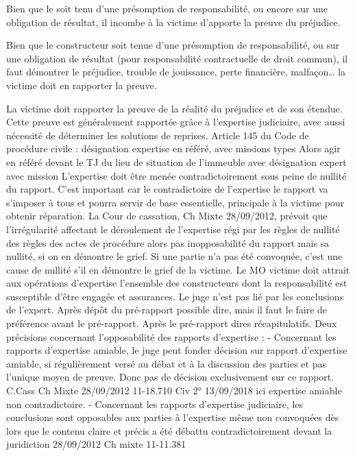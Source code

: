 			Bien que le \lo soit tenu d'une présomption de responsabilité, ou encore sur une obligation de résultat, il incombe à la victime d'apporte la preuve du préjudice.

			Bien que le constructeur soit tenue d’une présomption de responsabilité, ou sur une obligation de résultat (pour responsabilité contractuelle de droit commun), il faut démontrer le préjudice, trouble de jouissance, perte financière, malfaçon… la victime doit en rapporter la preuve.

			La victime doit rapporter la preuve de la réalité du préjudice et de son étendue. Cette preuve est généralement rapportée grâce à l’expertise judiciaire, avec aussi nécessité de déterminer les solutions de reprises.
			Article 145 du Code de procédure civile : désignation expertise en référé, avec missions types
			Alors agir en référé devant le TJ du lieu de situation de l’immeuble avec désignation expert avec mission
			L’expertise doit être menée contradictoirement sous peine de nullité du rapport. C’est important car le contradictoire de l’expertise le rapport va s’imposer à tous et pourra servir de base essentielle, principale à la victime pour obtenir réparation. La Cour de cassation, Ch Mixte 28/09/2012, prévoit que l’irrégularité affectant le déroulement de l’expertise régi par les règles de nullité des règles des actes de procédure alors pas inopposabilité du rapport mais sa nullité, si on en démontre le grief. Si une partie n’a pas été convoquée, c’est une cause de nullité s’il en démontre le grief de la victime.
			Le MO victime doit attrait aux opérations d’expertise l’ensemble des constructeurs dont la responsabilité est susceptible d’être engagée et assurances.
			Le juge n’est pas lié par les conclusions de l’expert.
			Après dépôt du pré-rapport possible dire, mais il faut le faire de préférence avant le pré-rapport. Après le pré-rapport dires récapitulatifs.
			Deux précisions concernant l’opposabilité des rapports d’expertise :
			-	Concernant les rapports d’expertise amiable, le juge peut fonder décision sur rapport d’expertise amiable, si régulièrement versé au débat et à la discussion des parties et pas l’unique moyen de preuve. Donc pas de décision exclusivement sur ce rapport. C.Cass Ch Mixte 28/09/2012 11-18.710 Civ 2° 13/09/2018 ici expertise amiable non contradictoire.
			-	Concernant les rapports d’expertise judiciaire, les conclusions sont opposables aux parties à l’expertise même non convoquées dès lors que le contenu claire et précis a été débattu contradictoirement devant la juridiction 28/09/2012 Ch mixte 11-11.381

